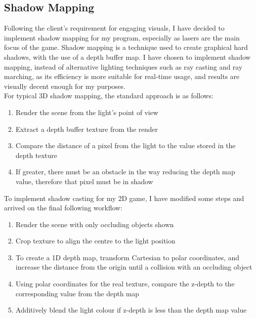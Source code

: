 \documentclass[../main/main.tex]{subfiles}
\begin{document}
\subsection{Shadow Mapping}
\label{sec:design-shadow}
Following the client's requirement for engaging visuals, I have decided to implement shadow mapping for my program, especially as lasers are the main focus of the game. Shadow mapping is a technique used to create graphical hard shadows, with the use of a depth buffer map. I have chosen to implement shadow mapping, instead of alternative lighting techniques such as ray casting and ray marching, as its efficiency is more suitable for real-time usage, and results are visually decent enough for my purposes.
\\
For typical 3D shadow mapping, the standard approach is as follows:

\begin{enumerate}
\item Render the scene from the light's point of view
\item Extract a depth buffer texture from the render
\item Compare the distance of a pixel from the light to the value stored in the depth texture
\item If greater, there must be an obstacle in the way reducing the depth map value, therefore that pixel must be in shadow
\end{enumerate}

\noindent To implement shadow casting for my 2D game, I have modified some steps and arrived on the final following workflow:

\begin{enumerate}
\item Render the scene with only occluding objects shown
\item Crop texture to align the centre to the light position
\item To create a 1D depth map, transform Cartesian to polar coordinates, and increase the distance from the origin until a collision with an occluding object
\item Using polar coordinates for the real texture, compare the z-depth to the corresponding value from the depth map
\item Additively blend the light colour if z-depth is less than the depth map value
\end{enumerate}
\end{document}
